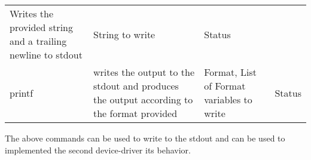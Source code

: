 \begin{longtable}[]{@{}llll@{}}
\begin{minipage}[t]{0.23\columnwidth}
Writes the provided string and a trailing newline to stdout\strut
\end{minipage} & \begin{minipage}[t]{0.30\columnwidth}\raggedright
String to write\strut
\end{minipage} & \begin{minipage}[t]{0.25\columnwidth}\raggedright
Status\strut
\end{minipage}\tabularnewline
\begin{minipage}[t]{0.11\columnwidth}\raggedright
printf\strut
\end{minipage} & \begin{minipage}[t]{0.23\columnwidth}\raggedright
writes the output to the stdout and produces the output according to the
format provided\strut
\end{minipage} & \begin{minipage}[t]{0.30\columnwidth}\raggedright
Format, List of Format variables to write\strut
\end{minipage} & \begin{minipage}[t]{0.25\columnwidth}\raggedright
Status\strut
\end{minipage}\tabularnewline
\bottomrule
\end{longtable}

The above commands can be used to write to the stdout and can be used to
implemented the second device-driver its behavior.
